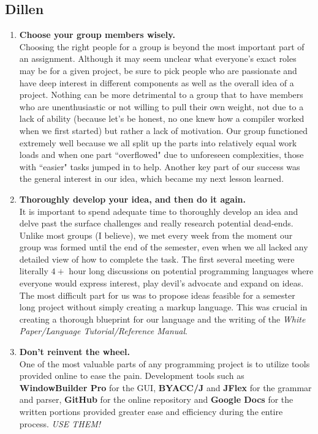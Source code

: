 \documentclass[12pt]{report}
\begin{document}
\subsection{Dillen}

\begin{enumerate}
\item \textbf{Choose your group members wisely.}\\
Choosing the right people for a group is beyond the most important part of an assignment. Although it may seem unclear what everyone's exact roles may be for a given project, be sure to pick people who are passionate and have deep interest in different components as well as the overall idea of a project. Nothing can be more detrimental to a group that to have members who are unenthusiastic or not willing to pull their own weight, not due to a lack of ability (because let's be honest, no one knew how a compiler worked when we first started) but rather a lack of motivation. Our group functioned extremely well because we all split up the parts into relatively equal work loads and when one part ``overflowed" due to unforeseen complexities, those with ``easier" tasks jumped in to help. Another key part of our success was the general interest in our idea, which became my next lesson learned.
\item \textbf{Thoroughly develop your idea, and then do it again.}\\
It is important to spend adequate time to thoroughly develop an idea and delve past the surface challenges and really research potential dead-ends. Unlike most groups (I believe), we met every week from the moment our group was formed until the end of the semester, even when we all lacked any detailed view of how to complete the task. The first several meeting were literally $4+$ hour long discussions on potential programming languages where everyone would express interest, play devil's advocate and expand on ideas. The most difficult part for us was to propose ideas feasible for a semester long project without simply creating a markup language. This was crucial in creating a thorough blueprint for our language and the writing of the \textit{White Paper/Language Tutorial/Reference Manual}.
\item \textbf{Don't reinvent the wheel.}\\
One of the most valuable parts of any programming project is to utilize tools provided online to ease the pain. Development tools such as \textbf{WindowBuilder Pro} for the GUI, \textbf{BYACC/J} and \textbf{JFlex} for the grammar and parser, \textbf{GitHub} for the online repository and \textbf{Google Docs} for the written portions provided greater ease and efficiency during the entire process. \textit{USE THEM!}

\end{enumerate}
\end{document}
